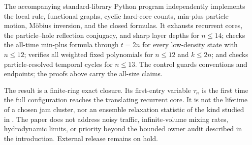 \documentclass[11pt,a4paper]{amsart}
\theoremstyle{definition}
\theoremstyle{remark}
\newcommand{\1}{\mathbf 1}
\begin{document}
The accompanying standard-library Python program independently implements
the local rule, functional graphs, cyclic hard-core counts, min-plus particle
motion, M\"obius inversion, and the closed formulas.  It exhausts recurrent
cores, the particle--hole reflection conjugacy, and sharp layer depths for
$n\leq14$; checks the all-time min-plus formula through $t=2n$ for every
low-density state with $n\leq12$; verifies all weighted fixed polynomials for
$n\leq12$ and $k\leq2n$; and checks particle-resolved temporal cycles for
$n\leq13$.  The control guards conventions and endpoints; the proofs above
carry the all-size claims.

The result is a finite-ring exact closure.  Its first-entry variable $\tau_n$
is the first time the full configuration reaches the translating recurrent
core.  It is not the lifetime of a chosen jam cluster, nor an ensemble
relaxation statistic of the kind studied in
\cite{JhaEtAl2025,JhaEtAl2026}.  The paper does not address noisy traffic,
infinite-volume mixing rates, hydrodynamic limits, or priority beyond the
bounded owner audit described in the introduction.  External release remains
on hold.



\end{document}
